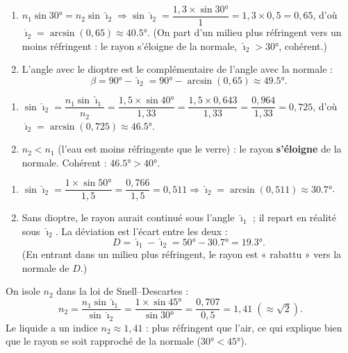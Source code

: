 \documentclass[11pt,a4paper]{article}
\begin{document}
\begin{corrige}
\begin{enumerate}[label=\alph*)]
  \item $n_1\sin\ang{30}=n_2\sin\hat{\imath}_2 \Rightarrow \sin\hat{\imath}_2
        =\dfrac{1{,}3\times\sin\ang{30}}{1}=1{,}3\times0{,}5=0{,}65$, d'où
        $\hat{\imath}_2=\arcsin(0{,}65)\approx\ang{40.5}$. (On part d'un milieu plus réfringent
        vers un moins réfringent : le rayon s'éloigne de la normale, $\hat{\imath}_2>\ang{30}$, cohérent.)
  \item L'angle avec le dioptre est le complémentaire de l'angle avec la normale :
        \[ \beta=\ang{90}-\hat{\imath}_2=\ang{90}-\arcsin(0{,}65)\approx\ang{49.5}. \]
\end{enumerate}
\end{corrige}

\begin{corrige}
\begin{enumerate}[label=\alph*)]
  \item $\sin\hat{\imath}_2=\dfrac{n_1\sin\hat{\imath}_1}{n_2}=\dfrac{1{,}5\times\sin\ang{40}}{1{,}33}
        =\dfrac{1{,}5\times0{,}643}{1{,}33}=\dfrac{0{,}964}{1{,}33}=0{,}725$, d'où
        $\hat{\imath}_2=\arcsin(0{,}725)\approx\ang{46.5}$.
  \item $n_2<n_1$ (l'eau est moins réfringente que le verre) : le rayon \textbf{s'éloigne} de la
        normale. Cohérent : $\ang{46.5}>\ang{40}$.
\end{enumerate}
\end{corrige}

\begin{corrige}
\begin{enumerate}[label=\alph*)]
  \item $\sin\hat{\imath}_2=\dfrac{1\times\sin\ang{50}}{1{,}5}=\dfrac{0{,}766}{1{,}5}=0{,}511
        \Rightarrow \hat{\imath}_2=\arcsin(0{,}511)\approx\ang{30.7}$.
  \item Sans dioptre, le rayon aurait continué sous l'angle $\hat{\imath}_1$ ; il repart en réalité
        sous $\hat{\imath}_2$. La déviation est l'écart entre les deux :
        \[ D=\hat{\imath}_1-\hat{\imath}_2=\ang{50}-\ang{30.7}=\ang{19.3}. \]
        (En entrant dans un milieu plus réfringent, le rayon est « rabattu » vers la normale de $D$.)
\end{enumerate}
\end{corrige}

\begin{corrige}
On isole $n_2$ dans la loi de Snell–Descartes :
\[ n_2=\frac{n_1\sin\hat{\imath}_1}{\sin\hat{\imath}_2}=\frac{1\times\sin\ang{45}}{\sin\ang{30}}
   =\frac{0{,}707}{0{,}5}=1{,}41\;(\approx\sqrt{2}). \]
Le liquide a un indice $n_2\approx1{,}41$ : plus réfringent que l'air, ce qui explique bien que le
rayon se soit rapproché de la normale ($\ang{30}<\ang{45}$).
\end{corrige}
\end{document}
